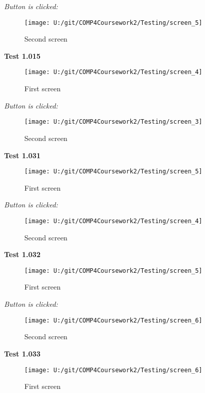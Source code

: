 \textit{Button is clicked: }

\begin{figure}[H]
    \label{fig: Second Screen}\caption{Second screen}
    \texttt{[image: U:/git/COMP4Coursework2/Testing/screen\_5]}
\end{figure}

\textbf{Test 1.015}

\begin{figure}[H]
    \label{fig: First Screen}\caption{First screen}
    \texttt{[image: U:/git/COMP4Coursework2/Testing/screen\_4]}
\end{figure}

\textit{Button is clicked: }

\begin{figure}[H]
    \label{fig: Second Screen}\caption{Second screen}
    \texttt{[image: U:/git/COMP4Coursework2/Testing/screen\_3]}
\end{figure}

\textbf{Test 1.031}

\begin{figure}[H]
    \label{fig: First Screen}\caption{First screen}
    \texttt{[image: U:/git/COMP4Coursework2/Testing/screen\_5]}
\end{figure}

\textit{Button is clicked: }

\begin{figure}[H]
    \label{fig: Second Screen}\caption{Second screen}
    \texttt{[image: U:/git/COMP4Coursework2/Testing/screen\_4]}
\end{figure}

\textbf{Test 1.032}

\begin{figure}[H]
    \label{fig: First Screen}\caption{First screen}
    \texttt{[image: U:/git/COMP4Coursework2/Testing/screen\_5]}
\end{figure}

\textit{Button is clicked: }

\begin{figure}[H]
    \label{fig: Second Screen}\caption{Second screen}
    \texttt{[image: U:/git/COMP4Coursework2/Testing/screen\_6]}
\end{figure}

\textbf{Test 1.033}

\begin{figure}[H]
    \label{fig: First Screen}\caption{First screen}
    \texttt{[image: U:/git/COMP4Coursework2/Testing/screen\_6]}
\end{figure}

